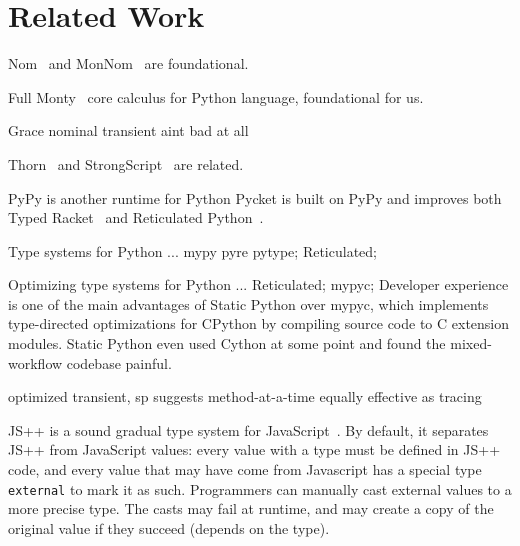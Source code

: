\documentclass[english,cleveref,submission]{programming}
\newcommand{\SP}{Static Python}
\newcommand{\code}[1]{\texttt{#1}}
\begin{document}



\section{Related Work}
\label{s:related}

Nom~\cite{mt-oopsla-2017} and MonNom~\cite{mt-oopsla-2021} are foundational.

Full Monty~\cite{pmmwplck-oopsla-2013} core calculus for Python language, foundational for us.

Grace nominal transient aint bad at all

Thorn~\cite{wnlov-popl-2010} and StrongScript~\cite{rzv-ecoop-2015} are related.

PyPy is another runtime for Python
Pycket is built on PyPy and improves both Typed Racket~\cite{bbst-oopsla-2017}
and Reticulated Python~\cite{vsc-dls-2019}.

Type systems for Python ...
mypy pyre pytype;
Reticulated;

Optimizing type systems for Python ...
Reticulated;
mypyc;
Developer experience is one of the main advantages of \SP{} over mypyc,
which implements type-directed optimizations for CPython
by compiling source code to C extension modules.
\SP{} even used Cython at some point and found the mixed-workflow codebase painful.

optimized transient, sp suggests method-at-a-time equally effective as tracing

JS++ is a sound gradual type system for JavaScript~\cite{jspp}.
By default, it separates JS++ from JavaScript values:
every value with a type must be defined in JS++ code,
and every value that may have come from Javascript has
a special type \code{external} to mark it as such.
Programmers can manually cast external values to a
more precise type.
The casts may fail at runtime, and may create a copy of
the original value if they succeed (depends on the type).
\end{document}
